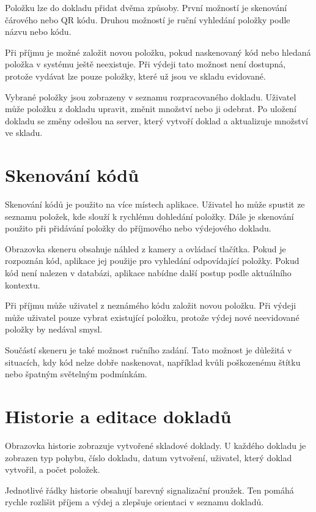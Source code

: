 \documentclass[czech, oth, kiv, he, pdf, viewonly]{fasthesis}
\begin{document}
Položku lze do dokladu přidat dvěma způsoby. První možností je
skenování čárového nebo QR kódu. Druhou možností je ruční vyhledání
položky podle názvu nebo kódu.

Při příjmu je možné založit novou položku, pokud naskenovaný kód nebo
hledaná položka v systému ještě neexistuje. Při výdeji tato možnost
není dostupná, protože vydávat lze pouze položky, které už jsou ve
skladu evidované.

Vybrané položky jsou zobrazeny v seznamu rozpracovaného dokladu.
Uživatel může položku z dokladu upravit, změnit množství nebo ji
odebrat. Po uložení dokladu se změny odešlou na server, který vytvoří
doklad a aktualizuje množství ve skladu.

\section{Skenování kódů}

Skenování kódů je použito na více místech aplikace. Uživatel ho může
spustit ze seznamu položek, kde slouží k rychlému dohledání položky.
Dále je skenování použito při přidávání položky do příjmového nebo
výdejového dokladu.

Obrazovka skeneru obsahuje náhled z kamery a ovládací tlačítka.
Pokud je rozpoznán kód, aplikace jej použije pro vyhledání odpovídající
položky. Pokud kód není nalezen v databázi, aplikace nabídne další
postup podle aktuálního kontextu.

Při příjmu může uživatel z neznámého kódu založit novou položku.
Při výdeji může uživatel pouze vybrat existující položku, protože
výdej nové neevidované položky by nedával smysl.

Součástí skeneru je také možnost ručního zadání. Tato možnost je
důležitá v situacích, kdy kód nelze dobře naskenovat, například kvůli
poškozenému štítku nebo špatným světelným podmínkám.

\section{Historie a editace dokladů}

Obrazovka historie zobrazuje vytvořené skladové doklady. U každého
dokladu je zobrazen typ pohybu, číslo dokladu, datum vytvoření,
uživatel, který doklad vytvořil, a počet položek.

Jednotlivé řádky historie obsahují barevný signalizační proužek.
Ten pomáhá rychle rozlišit příjem a výdej a zlepšuje orientaci
v seznamu dokladů.
\end{document}
